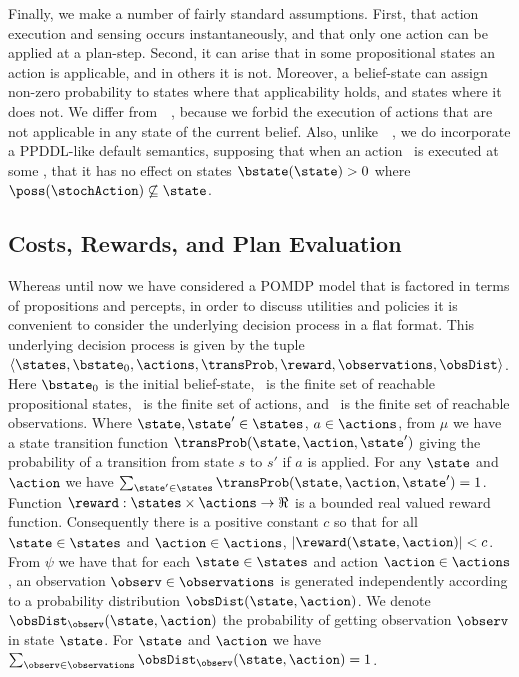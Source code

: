 \documentclass[letterpaper]{article}
\begin{document}
Finally, we make a number of fairly standard assumptions. First, that
action execution and sensing occurs instantaneously, and that only one
action can be applied at a plan-step. Second, it can arise that in
some propositional states an action is applicable, and in others it is
not. Moreover, a belief-state can assign non-zero probability to
states where that applicability holds, and states where it does
not. We differ
from~\citeauthor{younes:littman:04}~\citeyear{younes:littman:04},
because we forbid the execution of actions that are not applicable in
any state of the current belief.  Also,
unlike~\citeauthor{hoffmann:brafman:2006}~\citeyear{hoffmann:brafman:2006},
we do incorporate a PPDDL-like default semantics, supposing that when
an action \stochAction\ is executed at some \bstate, that it has no
effect on states $\bstate(\state) > 0$ where $\poss(\stochAction)
\not\subseteq \state$.


\subsection{Costs, Rewards, and Plan Evaluation}

Whereas until now we have considered a POMDP model that is factored in
terms of propositions and percepts, in order to discuss utilities and
policies it is convenient to consider the underlying decision process
in a flat format. This underlying decision process is given by the
tuple $\langle \states, \bstate_0, \actions, \transProb, \reward,
\observations, \obsDist \rangle$. Here $\bstate_0$ is the initial
belief-state, \states\ is the finite set of reachable propositional
states, \actions\ is the finite set of actions, and \observations\ is
the finite set of reachable observations.  Where $\state, \state' \in
\states$, $a \in \actions$, from $\mu$ we have a state transition
function $\transProb(\state, \action, \state')$ giving the probability
of a transition from state $s$ to $s'$ if $a$ is applied. For any
$\state$ and $\action$ we have $\sum_{\state' \in \states}
\transProb(\state, \action, \state') = 1$.
Function $\reward:\states \times \actions \to \Re$ is a bounded real
valued reward function.  Consequently there is a positive constant $c$
so that for all $\state \in \states$ and $\action \in \actions$,
$|\reward(\state, \action)| < c$.
From $\psi$ we have that for each $\state \in \states$ and action
$\action \in \actions$, an observation $\observ \in \observations$ is
generated independently according to a probability distribution
$\obsDist(\state, \action)$. We denote $\obsDist_\observ(\state,
\action)$ the probability of getting observation $\observ$ in state
$\state$. For $\state$ and $\action$ we have $\sum_{\observ \in
\observations} \obsDist_\observ(\state, \action) = 1$.
\end{document}
